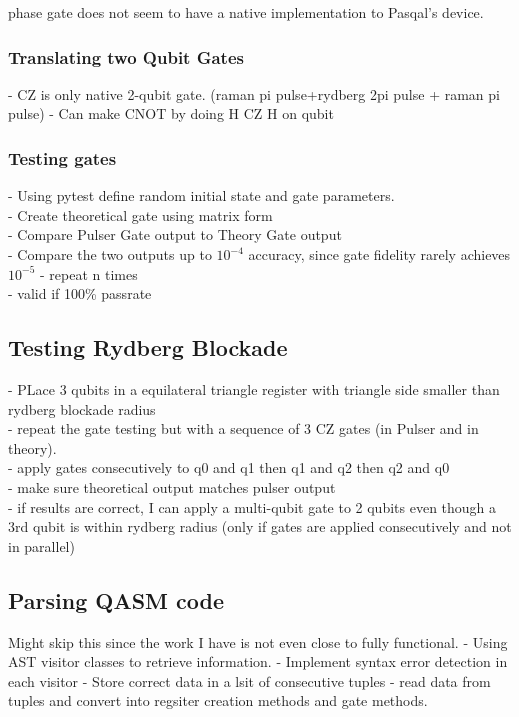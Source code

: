     phase gate does not seem to have a native implementation to Pasqal's device.

\subsubsection{Translating two Qubit Gates}
\label{sec:MultiGatesTranslating}
- CZ is only native 2-qubit gate. (raman pi pulse+rydberg 2pi pulse + raman pi pulse)
- Can make CNOT by doing H CZ H on qubit


\subsubsection{Testing gates}
\label{sec:MultiGatesTranslating}
- Using pytest define random initial state and gate parameters.\\
- Create theoretical gate using matrix form\\
- Compare Pulser Gate output to Theory Gate output \\
- Compare the two outputs up to $10^{-4}$ accuracy, since gate fidelity rarely achieves $10^{-5}$
- repeat n times\\
- valid if 100\% passrate


\subsection{Testing Rydberg Blockade}
- PLace 3 qubits in a equilateral triangle register with triangle side smaller than rydberg blockade radius\\
- repeat the gate testing but with a sequence of 3 CZ gates (in Pulser and in theory).\\
- apply gates consecutively to q0 and q1 then q1 and q2 then q2 and q0\\
- make sure theoretical output matches pulser output\\
- if results are correct, I can apply a multi-qubit gate to 2 qubits even though a 3rd qubit is within rydberg radius (only if gates are applied consecutively and not in parallel)\\


\subsection{Parsing QASM code}
Might skip this since the work I have is not even close to fully functional.
- Using AST visitor classes to retrieve information.
- Implement syntax error detection in each visitor
- Store correct data in a lsit of consecutive tuples
- read data from tuples and convert into regsiter creation methods and gate methods.
